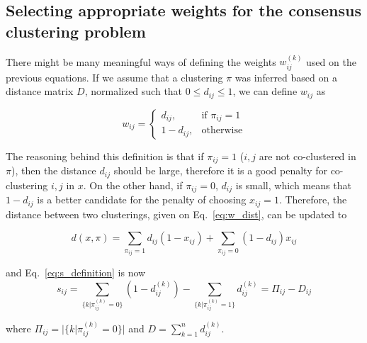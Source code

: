 \documentclass[a4paper,UKenglish]{lipics-v2016}
\begin{document}
\subsection{Selecting appropriate weights for the consensus clustering problem}

There might be many meaningful ways of defining the weights $w_{ij}^{(k)}$
used on the previous equations. 
If we assume that a clustering $\pi$ was inferred based on a distance matrix
$D$,  normalized such that  $0 \leq d_{ij} \leq 1$, we can define $w_{ij}$ as 

\begin{equation} \label{eq:weights}
w_{ij} = \begin{cases}  d_{ij},& \text{if } \pi_{ij}=1\\
    				  1-d_{ij}, & \text{otherwise}
\end{cases}
\end{equation}

The reasoning behind this definition is that if $\pi_{ij}=1$ ($i,j$ are not co-clustered in $\pi$), then 
the distance $d_{ij}$ should be large, therefore it is a good penalty for co-clustering $i,j$ in $x$. On the 
other hand, if  $\pi_{ij}=0$, $d_{ij}$ is small, which means that $1-d_{ij}$ is a better candidate for the penalty
of choosing $x_{ij}=1$. Therefore, the distance between two clusterings, given on Eq.~\eqref{eq:w_dist},
 can be updated to 

\begin{equation}
\label{eq:w_dist2}
d(x,\pi) = \sum_{\pi_{ij} = 1} d_{ij} (1 - x_{ij}) + \sum_{\pi_{ij} = 0} (1-d_{ij}) x_{ij}
\end{equation}

and Eq.~\eqref{eq:s_definition} is now
\begin{equation}
	\label{eq:s_definition_with_d}
s_{ij} = \sum_{\{k | \pi^{(k)}_{ij} = 0 \}} \left(1-d^{(k)}_{ij}\right) - \sum_{\{k | \pi^{(k)}_{ij} = 1 \}} d^{(k)}_{ij} = \Pi_{ij} - D_{ij}
\end{equation}

where $\Pi_{ij} = | \{k | \pi^{(k)}_{ij} = 0 \} |$ and $D = \sum_{k=1}^n d_{ij}^{(k)}$.
\end{document}

